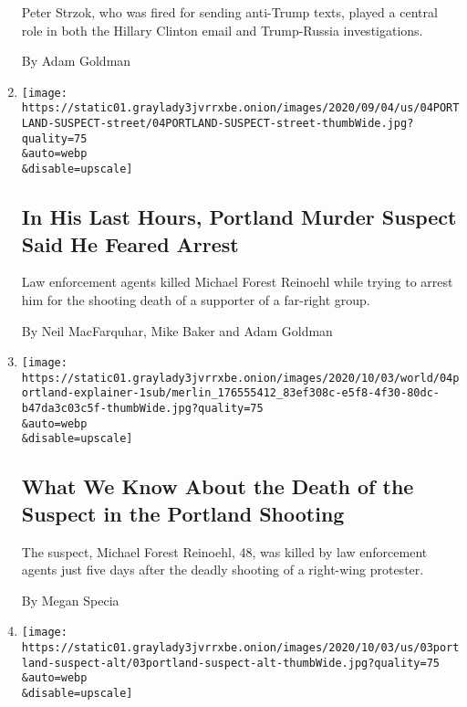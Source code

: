 \begin{enumerate}
  Peter Strzok, who was fired for sending anti-Trump texts, played a
  central role in both the Hillary Clinton email and Trump-Russia
  investigations.

  By Adam Goldman
\item
  \href{/2020/09/04/us/portland-shooting-michael-reinoehl.html}{}

  \texttt{[image: https://static01.graylady3jvrrxbe.onion/images/2020/09/04/us/04PORTLAND-SUSPECT-street/04PORTLAND-SUSPECT-street-thumbWide.jpg?quality=75\\\&auto=webp\\\&disable=upscale]}

  \hypertarget{in-his-last-hours-portland-murder-suspect-said-he-feared-arrest}{%
  \subsection{In His Last Hours, Portland Murder Suspect Said He Feared
  Arrest}\label{in-his-last-hours-portland-murder-suspect-said-he-feared-arrest}}

  Law enforcement agents killed Michael Forest Reinoehl while trying to
  arrest him for the shooting death of a supporter of a far-right group.

  By Neil MacFarquhar, Mike Baker and Adam Goldman
\item
  \href{/2020/09/04/us/michael-forest-reinoehl-portland.html}{}

  \texttt{[image: https://static01.graylady3jvrrxbe.onion/images/2020/10/03/world/04portland-explainer-1sub/merlin\_176555412\_83ef308c-e5f8-4f30-80dc-b47da3c03c5f-thumbWide.jpg?quality=75\\\&auto=webp\\\&disable=upscale]}

  \hypertarget{what-we-know-about-the-death-of-the-suspect-in-the-portland-shooting}{%
  \subsection{What We Know About the Death of the Suspect in the
  Portland
  Shooting}\label{what-we-know-about-the-death-of-the-suspect-in-the-portland-shooting}}

  The suspect, Michael Forest Reinoehl, 48, was killed by law
  enforcement agents just five days after the deadly shooting of a
  right-wing protester.

  By Megan Specia
\item
  \href{/2020/09/03/us/michael-reinoehl-arrest-portland-shooting.html}{}

  \texttt{[image: https://static01.graylady3jvrrxbe.onion/images/2020/10/03/us/03portland-suspect-alt/03portland-suspect-alt-thumbWide.jpg?quality=75\\\&auto=webp\\\&disable=upscale]}


\end{enumerate}
